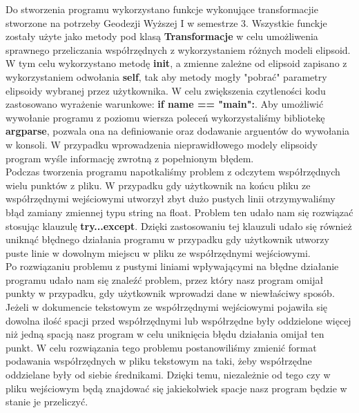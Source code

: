 \begin{flushleft}
	\hspace{1cm}Do stworzenia programu wykorzystano funkcje wykonujące transformacjie stworzone na potrzeby Geodezji Wyższej I w semestrze 3. Wszystkie funckje zostały użyte jako metody pod klasą \textbf{Transformacje} w celu umożliwenia sprawnego przeliczania współrzędnych z wykorzystaniem różnych modeli elipsoid. W tym celu wykorzystano metodę \textbf{init}, a zmienne zależne od elipsoid zapisano z wykorzystaniem odwołania \textbf{self}, tak aby metody mogły "pobrać" parametry elipsoidy wybranej przez użytkownika. W celu zwiększenia czytleności kodu zastosowano wyrażenie warunkowe: \textbf{if name == "main":}. Aby umożliwić wywołanie programu z poziomu wiersza poleceń wykorzystaliśmy bibliotekę \textbf{argparse}, pozwala ona na definiowanie oraz dodawanie arguentów do wywołania w konsoli. W przypadku wprowadzenia nieprawidłowego modely elipsoidy program wyśle informację zwrotną z popełnionym błędem.\\
	\hspace{1cm}Podczas tworzenia programu napotkaliśmy problem z odczytem współrzędnych wielu punktów z pliku. W przypadku gdy użytkownik na końcu pliku ze współrzędnymi wejściowymi utworzył zbyt dużo pustych linii otrzymywaliśmy błąd zamiany zmiennej typu string na float. Problem ten udało nam się rozwiązać stosując klauzulę \textbf{try...except}. Dzięki zastosowaniu tej klauzuli udało się również uniknąć błędnego działania programu w przypadku gdy użytkownik utworzy puste linie w dowolnym miejscu w pliku ze współrzędnymi wejściowymi.\\
	\hspace{1cm}Po rozwiązaniu problemu z pustymi liniami wpływającymi na błędne działanie programu udało nam się znaleźć problem, przez który nasz program omijał punkty w przypadku, gdy użytkownik wprowadzi dane w niewłaściwy sposób. Jeżeli w dokumencie tekstowym ze współrzędnymi wejściowymi pojawiła się dowolna ilość spacji przed współrzędnymi lub współrzędne były oddzielone więcej niż jedną spacją nasz program w celu uniknięcia błędu działania omijał ten punkt. W celu rozwiązania tego problemu postanowiliśmy zmienić format podawania współrzędnych w pliku tekstowym na taki, żeby współrzędne oddzielane były od siebie średnikami. Dzięki temu, niezależnie od tego czy w pliku wejściowym będą znajdować się jakiekolwiek spacje nasz program będzie w stanie je przeliczyć.
\end{flushleft}

